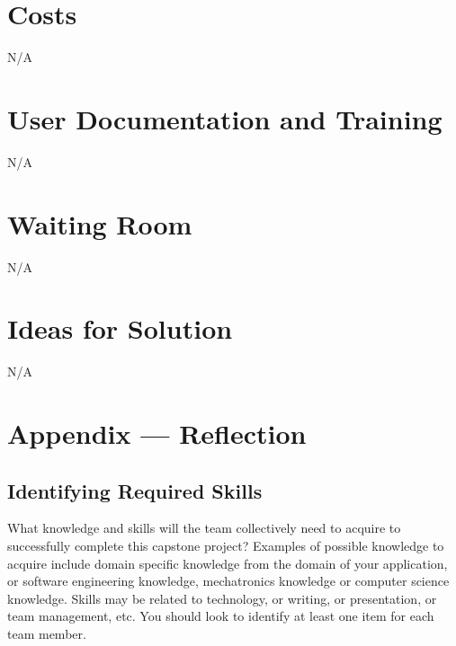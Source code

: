 \documentclass[12pt]{article}
\newcommand{\lips}{\textit{Insert your content here.}}
\begin{document}
\section{Costs}
N/A

\section{User Documentation and Training}

N/A


\section{Waiting Room}
N/A

\section{Ideas for Solution}
N/A

\newpage{}
\section*{Appendix --- Reflection}


\subsection*{Identifying Required Skills}
 What knowledge and skills will the team collectively need to acquire to successfully complete this capstone project?  Examples of possible knowledge to acquire include domain specific knowledge from the domain of your application, or software engineering knowledge, mechatronics knowledge or computer science knowledge.  Skills may be related to technology, or writing, or presentation, or team management, etc.  You should look to identify at least one item for each team member. \\
\end{document}
